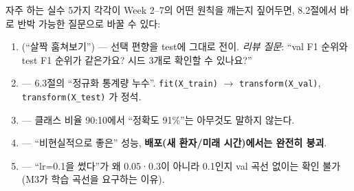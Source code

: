 \begin{frame}{자주 하는 실수 5가지}
  각각이 Week 2--7의 어떤 원칙을 깨는지 짚어두면, 8.2절에서
  바로 반박 가능한 질문으로 바꿀 수 있다:
  \begin{enumerate}
    \item {} (``살짝 훔쳐보기'') --- 선택
      편향을 test에 그대로 전이. \textit{리뷰 질문}: ``val F1
      순위와 test F1 순위가 같은가요? 시드 3개로 확인할 수
      있나요?''
    \item {} --- 6.3절의
      ``정규화 통계량 누수''. \texttt{fit(X\_train)} $\to$
      \texttt{transform(X\_val)}, \texttt{transform(X\_test)}
      가 정석.
    \item {} --- 클래스 비율 90:10에서
      ``정확도 91\%''는 아무것도 말하지 않는다.
    \item {} --- ``비현실적으로
      좋은'' 성능, \textbf{배포(새 환자/미래 시간)에서는 완전히
      붕괴}.
    \item {} --- ``lr=0.1을
      썼다''가 왜 0.05·0.3이 아니라 0.1인지 val 곡선 없이는
      확인 불가(M3가 학습 곡선을 요구하는 이유).
  \end{enumerate}
\end{frame}
